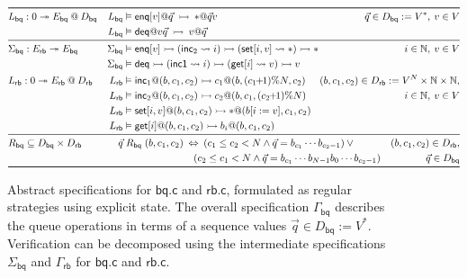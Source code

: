 \documentclass[acmsmall,screen,review,nonacm]{acmart}
\newcommand{\kw}[1]{\ensuremath{ \mathsf{#1} }}
\newcommand{\emptysig}{0}
\begin{document}
\begin{figure} %
  \small
\begin{align*}
\toprule
&
  L_\kw{bq} : \emptysig \twoheadrightarrow E_\kw{bq} \mathbin@ D_\kw{bq}
&  
  L_\kw{bq} &\vDash
      \kw{enq}[v] @ \vec{q}
      \:\rightarrowtail\:
      {*} @ \vec{q}v
&
  \hspace{-5em}
  \vec{q} \in D_\kw{bq} := V^*, \:
  v \in V
\\ &&
  L_\kw{bq} &\vDash
      \kw{deq} @ v\vec{q}
      \:\rightarrowtail\:
      v @ \vec{q}
\\
\midrule
&
  \Sigma_\kw{bq} : E_\kw{rb} \twoheadrightarrow E_\kw{bq}
&
  \Sigma_\kw{bq} &\vDash
      \kw{enq}[v] \rightarrowtail
      (\kw{inc}_2 \leadsto i) \rightarrowtail
      (\kw{set}[i, v] \leadsto *) \rightarrowtail
      *
&
  i \in \mathbb{N}, \:
  v \in V
\\ &&
    \Sigma_\kw{bq} &\vDash
      \kw{deq} \rightarrowtail
      (\kw{inc1} \leadsto i) \rightarrowtail
      (\kw{get}[i] \leadsto v) \rightarrowtail
      v
\\ &
  L_\kw{rb} : \emptysig \twoheadrightarrow E_\kw{rb} \mathbin@ D_\kw{rb}
&
  L_\kw{rb} &\vDash
    \kw{inc}_1@(b, c_1, c_2) \rightarrowtail
    c_1@(b, (c_1\!\!+\!\!1) \% N, c_2)
&
  \hspace{-8em}
  (b, c_1, c_2) \in D_\kw{rb} :=
    V^N \times \mathbb{N} \times \mathbb{N},
\\ &&
  L_\kw{rb} &\vDash
    \kw{inc}_2 @(b, c_1, c_2) \rightarrowtail
    c_2@(b, c_1, (c_2\!\!+\!\!1) \% N)
&
  i \in \mathbb{N}, \:
  v \in V
\\ &&
  L_\kw{rb} &\vDash
    \kw{set}[i, v]@(b, c_1, c_2) \rightarrowtail
    {*}@(b[i := v], c_1, c_2)
\\ &&
  L_\kw{rb} &\vDash
    \kw{get}[i]@(b, c_1, c_2) \rightarrowtail
    b_i@(b, c_1, c_2)
\\ \midrule &
  R_\kw{bq} \subseteq D_\kw{bq} \times D_\kw{rb}
&
        \vec{q} &\mathrel{R_\kw{bq}} (b, c_1, c_2) \: \Leftrightarrow \:
           (c_1 \le c_2 < N \wedge
            \vec{q} = b_{c_1} \cdots b_{c_2-1}) \vee {}
&
  (b, c_1, c_2) \in D_\kw{rb},
\\ &&
         & \hspace{16.3ex}
           (c_2 \le c_1 < N \wedge
            \vec{q} = b_{c_1} \cdots b_{N-1} b_0 \cdots b_{c_2 - 1})
&
  \vec{q} \in D_\kw{bq}
\\
\bottomrule
\end{align*}
\vspace{-2.5em}
  \caption{Abstract specifications for $\kw{bq.c}$ and $\kw{rb.c}$,
    formulated as regular strategies using explicit state.
    The overall specification $\Gamma_\kw{bq}$
    describes the queue operations in terms of
    a sequence values $\vec{q} \in D_\kw{bq} := V^*$.
    Verification can be decomposed using the intermediate specifications
    $\Sigma_\kw{bq}$ and $\Gamma_\kw{rb}$ for
    $\kw{bq.c}$ and $\kw{rb.c}$.}
  \label{fig:spec}
\end{figure}
\end{document}
